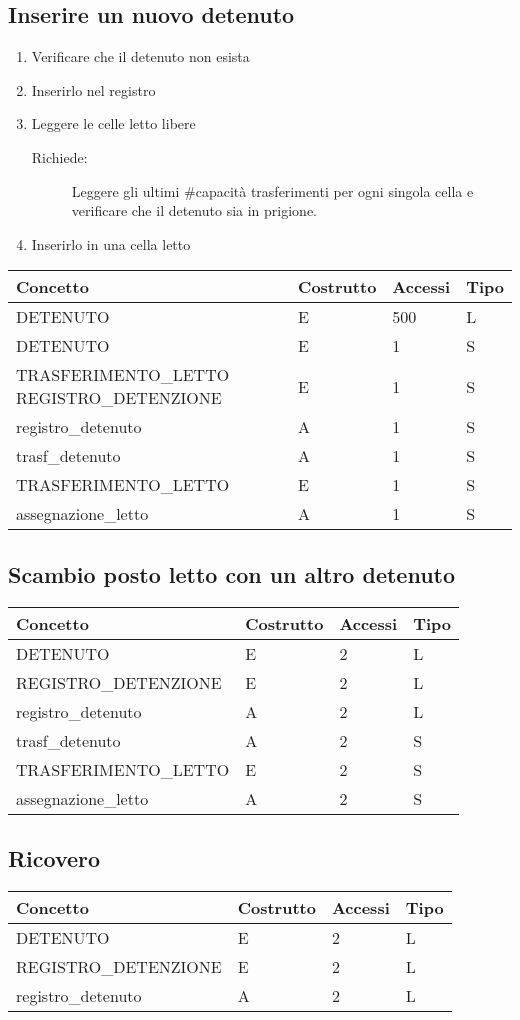 \documentclass[a4paper,12pt]{report}
\begin{document}
\subsection{Inserire un nuovo detenuto}
\begin{enumerate}
    \item Verificare che il detenuto non esista
    \item Inserirlo nel registro
    \item Leggere le celle letto libere
        \begin{description}
            \item[Richiede:] Leggere gli ultimi \#capacità trasferimenti per ogni singola cella e verificare che il detenuto sia in prigione.
        \end{description}
    \item Inserirlo in una cella letto
\end{enumerate}
\begin{table}[H]
\begin{tabular}{p{5cm} p{2cm} p{1cm} p{1cm}}
\hline
Concetto & Costrutto & Accessi & Tipo \\ \hline
DETENUTO & E & 500 & L \\
DETENUTO & E & 1 & S \\
TRASFERIMENTO\_LETTO
REGISTRO\_DETENZIONE & E & 1 & S \\
registro\_detenuto & A & 1 & S \\
trasf\_detenuto & A & 1 & S \\
TRASFERIMENTO\_LETTO & E & 1 & S \\
assegnazione\_letto & A & 1 & S \\
\end{tabular}
\end{table}
\subsection{Scambio posto letto con un altro detenuto}
\begin{table}[H]
\begin{tabular}{p{5cm} p{2cm} p{1cm} p{1cm}}
\hline
Concetto & Costrutto & Accessi & Tipo \\ \hline
DETENUTO & E & 2 & L \\
REGISTRO\_DETENZIONE & E & 2 & L \\
registro\_detenuto & A & 2 & L \\
trasf\_detenuto & A & 2 & S \\
TRASFERIMENTO\_LETTO & E & 2 & S \\
assegnazione\_letto & A & 2 & S \\
\end{tabular}
\end{table}
\subsection{Ricovero}
\begin{table}[H]
\begin{tabular}{p{5cm} p{2cm} p{1cm} p{1cm}}
\hline
Concetto & Costrutto & Accessi & Tipo \\ \hline
DETENUTO & E & 2 & L \\
REGISTRO\_DETENZIONE & E & 2 & L \\
registro\_detenuto & A & 2 & L \\
\end{tabular}
\end{table}
\end{document}
